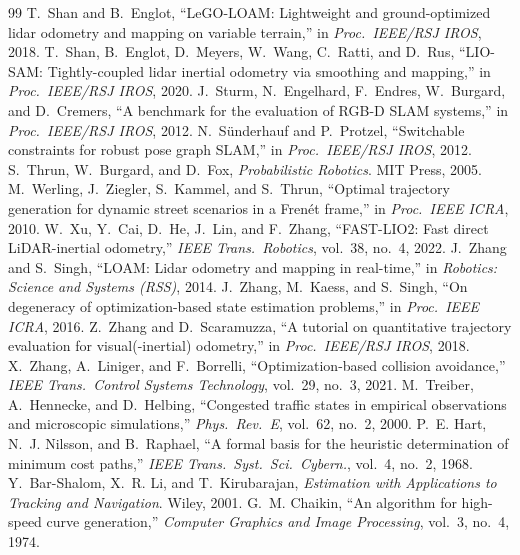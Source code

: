 \documentclass[11pt,a4paper]{article}
\begin{document}
\begin{thebibliography}{99}
 T.~Shan and B.~Englot, ``LeGO-LOAM: Lightweight and ground-optimized lidar odometry and mapping on variable terrain,'' in \emph{Proc.\ IEEE/RSJ IROS}, 2018.
 T.~Shan, B.~Englot, D.~Meyers, W.~Wang, C.~Ratti, and D.~Rus, ``LIO-SAM: Tightly-coupled lidar inertial odometry via smoothing and mapping,'' in \emph{Proc.\ IEEE/RSJ IROS}, 2020.
 J.~Sturm, N.~Engelhard, F.~Endres, W.~Burgard, and D.~Cremers, ``A benchmark for the evaluation of RGB-D SLAM systems,'' in \emph{Proc.\ IEEE/RSJ IROS}, 2012.
 N.~S{\"u}nderhauf and P.~Protzel, ``Switchable constraints for robust pose graph SLAM,'' in \emph{Proc.\ IEEE/RSJ IROS}, 2012.
 S.~Thrun, W.~Burgard, and D.~Fox, \emph{Probabilistic Robotics}. MIT Press, 2005.
 M.~Werling, J.~Ziegler, S.~Kammel, and S.~Thrun, ``Optimal trajectory generation for dynamic street scenarios in a Frenét frame,'' in \emph{Proc.\ IEEE ICRA}, 2010.
 W.~Xu, Y.~Cai, D.~He, J.~Lin, and F.~Zhang, ``FAST-LIO2: Fast direct LiDAR-inertial odometry,'' \emph{IEEE Trans.\ Robotics}, vol.~38, no.~4, 2022.
 J.~Zhang and S.~Singh, ``LOAM: Lidar odometry and mapping in real-time,'' in \emph{Robotics: Science and Systems (RSS)}, 2014.
 J.~Zhang, M.~Kaess, and S.~Singh, ``On degeneracy of optimization-based state estimation problems,'' in \emph{Proc.\ IEEE ICRA}, 2016.
 Z.~Zhang and D.~Scaramuzza, ``A tutorial on quantitative trajectory evaluation for visual(-inertial) odometry,'' in \emph{Proc.\ IEEE/RSJ IROS}, 2018.
 X.~Zhang, A.~Liniger, and F.~Borrelli, ``Optimization-based collision avoidance,'' \emph{IEEE Trans.\ Control Systems Technology}, vol.~29, no.~3, 2021.
 M.~Treiber, A.~Hennecke, and D.~Helbing, ``Congested traffic states in empirical observations and microscopic simulations,'' \emph{Phys.\ Rev.\ E}, vol.~62, no.~2, 2000.
 P.~E. Hart, N.~J. Nilsson, and B.~Raphael, ``A formal basis for the heuristic determination of minimum cost paths,'' \emph{IEEE Trans.\ Syst.\ Sci.\ Cybern.}, vol.~4, no.~2, 1968.
 Y.~Bar-Shalom, X.~R. Li, and T.~Kirubarajan, \emph{Estimation with Applications to Tracking and Navigation}. Wiley, 2001.
 G.~M. Chaikin, ``An algorithm for high-speed curve generation,'' \emph{Computer Graphics and Image Processing}, vol.~3, no.~4, 1974.
\end{thebibliography}

\appendix
\end{document}
